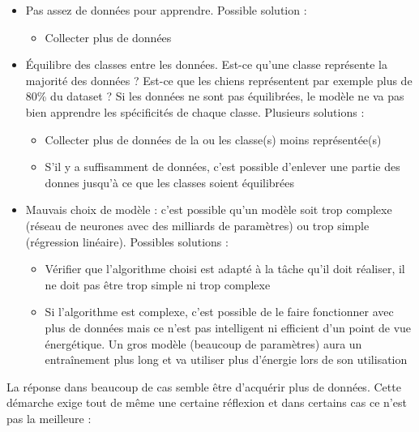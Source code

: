 \begin{itemize}
    \item Pas assez de données pour apprendre. Possible solution :
    \begin{itemize}
        \item Collecter plus de données
    \end{itemize}
    
    \item Équilibre des classes entre les données. Est-ce qu'une classe représente la majorité des données ? Est-ce que les chiens représentent par exemple plus de 80\% du dataset ? Si les données ne sont pas équilibrées, le modèle ne va pas bien apprendre les spécificités de chaque classe. Plusieurs solutions :
    \begin{itemize}
        \item Collecter plus de données de la ou les classe(s) moins représentée(s)
        \item S'il y a suffisamment de données, c'est possible d'enlever une partie des donnes jusqu'à ce que les classes soient équilibrées
    \end{itemize}
    
    \item Mauvais choix de modèle : c'est possible qu'un modèle soit trop complexe (réseau de neurones avec des milliards de paramètres) ou trop simple (régression linéaire). Possibles solutions :
    \begin{itemize}
        \item Vérifier que l'algorithme choisi est adapté à la tâche qu'il doit réaliser, il ne doit pas être trop simple ni trop complexe
        \item Si l'algorithme est complexe, c'est possible de le faire fonctionner avec plus de données mais ce n'est pas intelligent ni efficient d'un point de vue énergétique. Un gros modèle (beaucoup de paramètres) aura un entraînement plus long et va utiliser plus d'énergie lors de son utilisation
    \end{itemize}
\end{itemize}

\par{La réponse dans beaucoup de cas semble être d'acquérir plus de données. Cette démarche exige tout de même une certaine réflexion et dans certains cas ce n'est pas la meilleure :}

